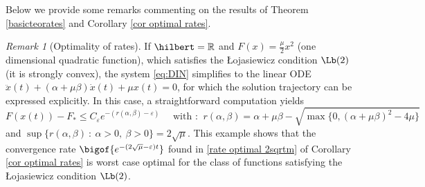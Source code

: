 \documentclass[reqno]{amsart}
\theoremstyle{plain}
\theoremstyle{definition}
\theoremstyle{remark}
\newtheorem{remark}{Remark}	%
\newcommand{\R}{\mathbb{R}}	%
\begin{document}
Below we provide some remarks commenting on the results of Theorem \ref{basicteorates} and Corollary \ref{cor optimal rates}. 
\begin{remark}[Optimality of rates]\label{rem:optimality rates}
	If $\hilbert=\R$ and $F(x)=\frac{\mu}{2}x^{2}$ (one dimensional quadratic function), which satisfies the \L ojasiewicz condition \hyperref[PL]{$\Lb(2)$} (it is strongly convex), the system \eqref{eq:DIN} simplifies to the linear ODE $\ddot{x}(t) +(\alpha+\mu\beta)\dot{x}(t) + \mu x(t)=0$, for which the solution trajectory can be expressed explicitly. In this case, a straightforward computation yields
	\begin{equation}
		F(x(t)) - F_{\ast} \leq C_{\varepsilon} e ^{-(r(\alpha,\beta)-\varepsilon)} \quad \text{ with : } ~ r(\alpha,\beta)=\alpha+\mu\beta -\sqrt{\max\{0,(\alpha+\mu\beta)^{2}-4\mu\}}
	\end{equation}
	and $\sup\{r(\alpha,\beta)~:~\alpha>0 ,~ \beta >0\} = 2\sqrt{\mu}$. This example shows that the convergence rate $\bigof{e^{-(2\sqrt{\mu}-\varepsilon)t}}$ found in \eqref{rate optimal 2sqrtm} of Corollary \ref{cor optimal rates} is worst case optimal for the class of functions satisfying the \L ojasiewicz condition \hyperref[PL]{$\Lb(2)$}.
\end{remark}
\end{document}
